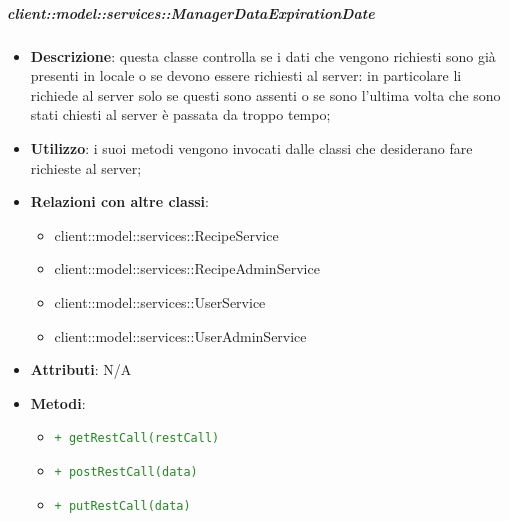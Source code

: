 		\subparagraph{client::model::services::ManagerDataExpirationDate} %
		\label{subp:radarchartcreator}
			\begin{itemize}
				\item \textbf{Descrizione}: questa classe controlla se i dati che vengono richiesti sono già presenti in locale o se devono essere richiesti al server: in particolare li richiede al server solo se questi sono assenti o se sono l'ultima volta che sono stati chiesti al server è passata da troppo tempo;
				\item \textbf{Utilizzo}: i suoi metodi vengono invocati dalle classi che desiderano fare richieste al server;
				\item \textbf{Relazioni con altre classi}:
					\begin{itemize}
						\item client::model::services::RecipeService
						\item client::model::services::RecipeAdminService
						\item client::model::services::UserService
						\item client::model::services::UserAdminService
					\end{itemize}
				\item \textbf{Attributi}: N/A
				\item \textbf{Metodi}: 
				\begin{itemize}
					\item \textcolor{forestgreen}{\texttt{+ getRestCall(restCall)}}
					\item \textcolor{forestgreen}{\texttt{+ postRestCall(data)}}
					\item \textcolor{forestgreen}{\texttt{+ putRestCall(data)}}
\end{itemize}
\end{itemize}
